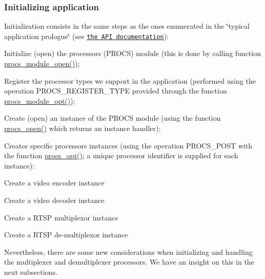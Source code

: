 \subsubsection*{Initializing application}

Initialization consists in the same steps as the ones enumerated in the \char`\"{}typical application prologue\char`\"{} (see \href{md_DOCUMENTATION.html#How_to_use_a_Processor_the_API}{\tt the A\+PI documentation})\+:


\begin{DoxyEnumerate}
\item Initialize (open) the processors (P\+R\+O\+CS) module (this is done by calling function \textquotesingle{}\hyperlink{procs_8c_af5f91a46882b5706b25327384ba347d8}{procs\+\_\+module\+\_\+open()}\textquotesingle{});
\item Register the processor types we support in the application (performed using the operation \textquotesingle{}P\+R\+O\+C\+S\+\_\+\+R\+E\+G\+I\+S\+T\+E\+R\+\_\+\+T\+Y\+PE\textquotesingle{} provided through the function \textquotesingle{}\hyperlink{procs_8c_a226ac6dfd7598a59b9ceab3a92239a80}{procs\+\_\+module\+\_\+opt()}\textquotesingle{});
\item Create (open) an instance of the P\+R\+O\+CS module (using the function \textquotesingle{}\hyperlink{procs_8c_ac44b6ac931afbeadeb7f07b660e30bac}{procs\+\_\+open()}\textquotesingle{} which returns an instance handler);
\item Creates specific processors instances (using the operation \textquotesingle{}P\+R\+O\+C\+S\+\_\+\+P\+O\+ST\textquotesingle{} with the function \textquotesingle{}\hyperlink{procs_8c_a7af2e6f2788006cfc96ca8d811922ffa}{procs\+\_\+opt()}\textquotesingle{}; a unique processor identifier is supplied for each instance)\+:
\begin{DoxyItemize}
\item Create a video encoder instance
\item Create a video decoder instance
\item Create a R\+T\+SP multiplexor instance
\item Create a R\+T\+SP de-\/multiplexor instance
\end{DoxyItemize}
\end{DoxyEnumerate}

Nevertheless, there are some new considerations when initializing and handling the multiplexer and demultiplexer processors. We have an insight on this in the next subsections.

